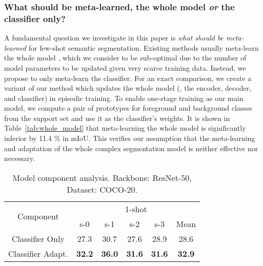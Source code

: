 \documentclass[10pt,twocolumn,letterpaper]{article}
\begin{document}
\subsubsection{What should be meta-learned, the whole model {\em or} the classifier only?}
\label{evidence}
A fundamental question we investigate in this paper is {\em what should be meta-learned} for few-shot semantic segmentation.
Existing methods usually meta-learn the whole model \cite{yang2020prototype, cao2020few},
which we consider to be sub-optimal  due to the number of model parameters to be updated given  very scarce training data.
Instead, we propose to only meta-learn the classifier.
For an exact comparison, we create a variant of our method 
which updates the whole model (\ie, the encoder, decoder, and classifier) in episodic training.
To enable one-stage training as our main model,
we compute a pair of prototypes for foreground and background classes from the support set 
and use it as the classifier's weights.
It is shown in Table~\ref{tab:whole_model} that
meta-learning the whole model is significantly inferior
by {11.4 \%} in mIoU.
This verifies our assumption that the meta-learning and adaptation of the whole complex segmentation model is neither effective nor necessary.




\begin{table}[h]
    \centering
    \begin{tabular}{c|ccccc}
    \hline
         \multirow{2}{*}{Component} & \multicolumn{5}{c}{1-shot}  \\
         \cline{2-6}
          & s-0 & s-1 & s-2 & s-3 & Mean \\
         \hline
         Classifier Only & 27.3 & 30.7 & 27.6 & 28.9 & 28.6  \\
         Classifier Adapt. & \textbf{32.2} & \textbf{36.0} & \textbf{31.6} & \textbf{31.6} & \textbf{32.9} \\
         \hline
    \end{tabular}
    \vspace{2pt}
    \caption{
    Model component analysis.
    Backbone: ResNet-50,
    Dataset: COCO-20.
}
    \label{tab:baseline}
\end{table}

\vspace{-0.6cm}
\end{document}
